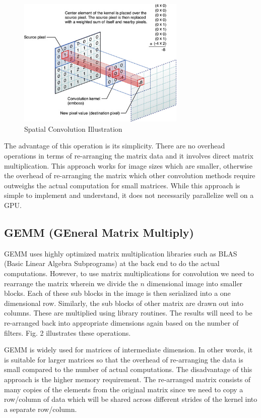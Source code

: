 \documentclass[sigconf]{acmart}
\begin{document}
\begin{figure}[h] 
	\includegraphics[width=8cm]{images/SpatialConvolution.png}
	\caption {Spatial Convolution Illustration}
	\label{SpatialConvolutionIllustration}
\end{figure}

The advantage of this operation is its simplicity. There are no overhead operations in terms of re-arranging the matrix data and it involves direct matrix multiplication. This approach works for image sizes which are smaller, otherwise the overhead of re-arranging the matrix which other convolution methods require outweighs the actual computation for small matrices. While this approach is simple to implement and understand, it does not necessarily parallelize well on a GPU.

\subsection{GEMM (GEneral Matrix Multiply)}
GEMM uses highly optimized matrix multiplication libraries such as BLAS (Basic Linear Algebra Subprograms) at the back end to do the actual computations. However, to use matrix multiplications for convolution we need to rearrange the matrix wherein we divide the $n$ dimensional image into smaller 
blocks. Each of these sub blocks in the image is then serialized into a one dimensional row. Similarly, the sub blocks of other matrix are drawn out into columns. These are multiplied using library routines. The results will need to be re-arranged back into appropriate dimensions again based on the number of filters. Fig. 2 illustrates these operations. 

GEMM is widely used for matrices of intermediate dimension. In other words, it is suitable for larger matrices so that the overhead of re-arranging the data is small compared to the number of actual computations. The disadvantage of this approach is the higher memory requirement. The re-arranged matrix consists of many copies of the elements from the original matrix since we need to copy a row/column of data which will be shared across different strides of the kernel into a separate row/column.
\end{document}
